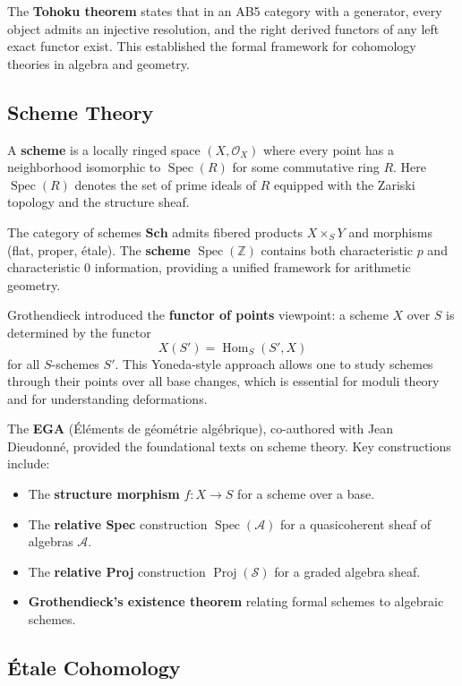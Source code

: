 The \textbf{Tohoku theorem} states that in an AB5 category with a generator,
every object admits an injective resolution, and the right derived functors of
any left exact functor exist. This established the formal framework for
cohomology theories in algebra and geometry.

\subsection*{Scheme Theory}

A \textbf{scheme} is a locally ringed space $(X, \mathcal{O}_X)$ where every
point has a neighborhood isomorphic to $\operatorname{Spec}(R)$ for some
commutative ring $R$. Here $\operatorname{Spec}(R)$ denotes the set of prime
ideals of $R$ equipped with the Zariski topology and the structure sheaf.

The category of schemes $\mathbf{Sch}$ admits fibered products $X \times_S Y$
and morphisms (flat, proper, étale). The \textbf{scheme} $\operatorname{Spec}(\mathbb{Z})$
contains both characteristic $p$ and characteristic $0$ information, providing
a unified framework for arithmetic geometry.

Grothendieck introduced the \textbf{functor of points} viewpoint: a scheme $X$
over $S$ is determined by the functor
\[
X(S') = \operatorname{Hom}_S(S', X)
\]
for all $S$-schemes $S'$. This Yoneda-style approach allows one to study
schemes through their points over all base changes, which is essential for
moduli theory and for understanding deformations.

The \textbf{EGA} (Éléments de géométrie algébrique), co-authored with Jean
Dieudonné, provided the foundational texts on scheme theory. Key constructions
include:
\begin{itemize}
\item The \textbf{structure morphism} $f: X \to S$ for a scheme over a base.
\item The \textbf{relative Spec} construction $\operatorname{Spec}(\mathcal{A})$
for a quasicoherent sheaf of algebras $\mathcal{A}$.
\item The \textbf{relative Proj} construction $\operatorname{Proj}(\mathcal{S})$
for a graded algebra sheaf.
\item \textbf{Grothendieck's existence theorem} relating formal schemes to
algebraic schemes.
\end{itemize}

\subsection*{Étale Cohomology}

